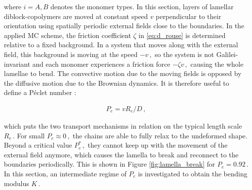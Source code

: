 \documentclass[bachelor,       %
               twoside,        %
               BCOR10mm,       %
               ngerman, english %
               ]{GAUBM}
\begin{document}
where $i=A,B$ denotes the monomer types. In this section, layers of lamellar diblock-copolymers are moved at constant speed $v$ perpendicular to their orientation using spatially periodic external fields close to the boundaries. In the applied \ac{MC} scheme, the friction coefficient $\zeta$ in \eqref{eq:d_rouse} is determined relative to a fixed background. In a system that moves along with the external field, this background is moving at the speed $-v\,,$ so the system is not Galilei-invariant and each monomer experiences a friction force $-\zeta v\,,$ causing the whole lamellae to bend. The convective motion due to the moving fields is opposed by the diffusive motion due to the Brownian dynamics. It is therefore useful to define a P\'eclet number \cite{peclet}:

\begin{align}
    P_e= vR_e/D\,,
\end{align}


which puts the two transport mechanisms in relation on the typical length scale $R_e\,.$ For small $P_e\approx0\,,$ the chains are able to fully relax to the undeformed shape. Beyond a critical value $P_e^*\,,$ they cannot keep up with the movement of the external field anymore, which causes the lamella to break and reconnect to the boundaries periodically. This is shown in Figure \ref{fig:lamella_break} for $P_e=0.92\,.$ In this section, an intermediate regime of $P_e$ is investigated to obtain the bending modulus $K\,.$ 
\end{document}
